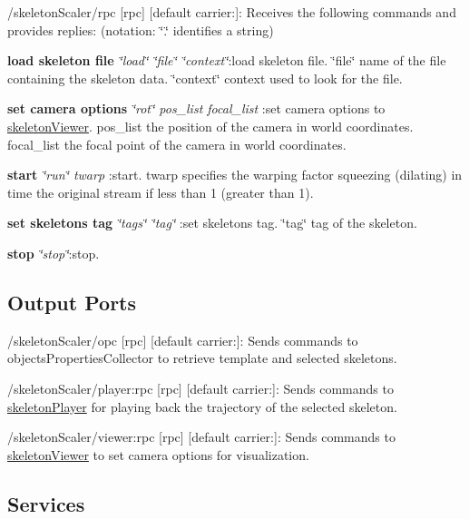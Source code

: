 \begin{DoxyItemize}
\item /skeleton\+Scaler/rpc \mbox{[}rpc\mbox{]} \mbox{[}default carrier\+:\mbox{]}\+: Receives the following commands and provides replies\+: (notation\+: \char`\"{}.\char`\"{} identifies a string)
\begin{DoxyEnumerate}
\item {\bfseries load skeleton file} {\itshape \char`\"{}load\char`\"{} \char`\"{}file\char`\"{} \char`\"{}context\char`\"{}}\+:load skeleton file. \char`\"{}file\char`\"{} name of the file containing the skeleton data. \char`\"{}context\char`\"{} context used to look for the file.
\item {\bfseries set camera options} {\itshape \char`\"{}rot\char`\"{} pos\+\_\+list focal\+\_\+list }\+:set camera options to \hyperlink{group__skeletonViewer}{skeleton\+Viewer}. pos\+\_\+list the position of the camera in world coordinates. focal\+\_\+list the focal point of the camera in world coordinates.
\item {\bfseries start} {\itshape \char`\"{}run\char`\"{} twarp }\+:start. twarp specifies the warping factor squeezing (dilating) in time the original stream if less than 1 (greater than 1).
\item {\bfseries set skeleton\textquotesingle{}s tag} {\itshape \char`\"{}tags\char`\"{} \char`\"{}tag\char`\"{} }\+:set skeleton\textquotesingle{}s tag. \char`\"{}tag\char`\"{} tag of the skeleton.
\item {\bfseries stop} {\itshape \char`\"{}stop\char`\"{}}\+:stop.
\end{DoxyEnumerate}
\end{DoxyItemize}\hypertarget{group__skeletonViewer_outputports_sec}{}\subsection{Output Ports}\label{group__skeletonViewer_outputports_sec}

\begin{DoxyItemize}
\item /skeleton\+Scaler/opc \mbox{[}rpc\mbox{]} \mbox{[}default carrier\+:\mbox{]}\+: Sends commands to objects\+Properties\+Collector to retrieve template and selected skeletons.
\item /skeleton\+Scaler/player\+:rpc \mbox{[}rpc\mbox{]} \mbox{[}default carrier\+:\mbox{]}\+: Sends commands to \hyperlink{group__skeletonPlayer}{skeleton\+Player} for playing back the trajectory of the selected skeleton.
\item /skeleton\+Scaler/viewer\+:rpc \mbox{[}rpc\mbox{]} \mbox{[}default carrier\+:\mbox{]}\+: Sends commands to \hyperlink{group__skeletonViewer}{skeleton\+Viewer} to set camera options for visualization.
\end{DoxyItemize}\hypertarget{group__skeletonViewer_services_sec}{}\subsection{Services}\label{group__skeletonViewer_services_sec}
